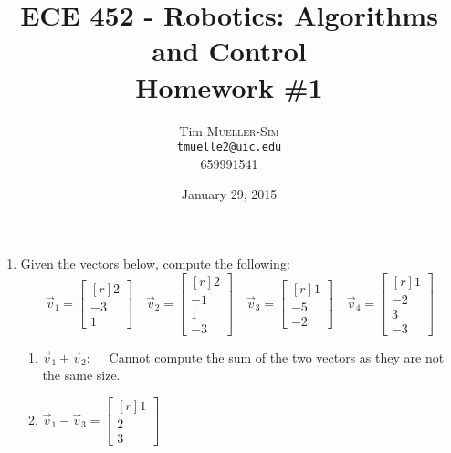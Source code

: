 \documentclass[10pt, oneside, letter]{article}
\begin{document}
\title{{\sc ECE 452} - {\sc Robotics: Algorithms and Control} \\ {\large \sc Homework \#1}}
\author{Tim \textsc{Mueller-Sim} \\ {\tt tmuelle2@uic.edu} \\ \textsc{659991541} }
\date{January 29, 2015}

\vspace{-5ex}

\maketitle 

\vspace{-5ex}
\noindent \hrulefill

	\begin{enumerate}

	\item Given the vectors below, compute the following:
	$$\vec{v}_1 = 
	\begin{bmatrix*}[r]
	2 \\ -3 \\ 1
	\end{bmatrix*}
	\quad
	\vec{v}_2 = 
	\begin{bmatrix*}[r]
	2 \\ -1 \\ 1 \\ -3
	\end{bmatrix*}
	\quad
	\vec{v}_3 = 
	\begin{bmatrix*}[r]
	1 \\ -5 \\ -2
	\end{bmatrix*}
	\quad
	\vec{v}_4 = 
	\begin{bmatrix*}[r]
	1 \\ -2 \\ 3 \\ -3
	\end{bmatrix*}
	$$

		\begin{enumerate}
		\item $\vec{v}_1 + \vec{v}_2: \quad$
		Cannot compute the sum of the two vectors as they are not the same size.
	
		\item $\vec{v}_1 - \vec{v}_3 = \begin{bmatrix*}[r]
		1 \\ 2 \\ 3
		\end{bmatrix*}$
	

\end{enumerate}
\end{enumerate}
\end{document}
